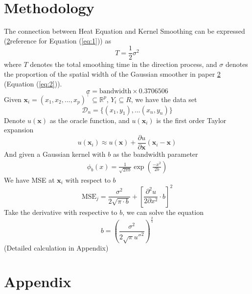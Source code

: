 \documentclass{article}
\begin{document}
\section{Methodology}
The connection between Heat Equation and Kernel Smoothing can be expressed (\ref{}reference for Equation (\ref{eq:1})) as
\begin{equation}
    T = \frac{1}{2} \sigma^2         \label{eq:1}
\end{equation} 
where $T$ denotes the total smoothing time in the direction process, and $\sigma$ denotes the proportion of the spatial width of the Gaussian smoother in paper \ref{} (Equation (\ref{eq:2})).
\begin{equation}
    \sigma = \text{bandwidth}\times 0.3706506  \label{eq:2}
\end{equation}
Given $\mathbf{x}_i =(x_1, x_2,...,x_p)^\top \subseteq \mathbb{R}^p $, $Y_i\subseteq R$, we have the data set $$\mathcal{D}_n = \big\{(x_1, y_1),... (x_n, y_n)\big\}$$
Denote $u(\mathbf{x})$ as the oracle function, and $u(\mathbf{x}_i)$ is the first order Taylor expansion
\begin{equation}
      u(\mathbf{x}_i) \approx u(\mathbf{x}) + \frac{\partial u}{\partial \mathbf{x}}(\mathbf{x}_i - \mathbf{x}) 
\end{equation}
And given a Gaussian kernel with $b$ as the bandwidth parameter
\begin{align}
    \phi_b (x) = \frac{1}{\sqrt{2 \pi b}}\exp(\frac{-x^2}{2b})
\end{align}
We have MSE at $\mathbf{x}_i$ with respect to $b$
\begin{equation}
         \text{MSE}_j=  \frac{\sigma^2}{2\sqrt{\pi \cdot b}}  + \left[\frac{\partial^2 u}{2\partial x^2}\cdot b \right]^2
\end{equation}
Take the derivative with respective to $b$, we can solve the equation 
\begin{equation}
    b =\left(\frac{\sigma^2}{2\sqrt{\pi} u''^2}\right)^{\frac{2}{5}} 
\end{equation}
(Detailed calculation in Appendix) 












\pagebreak

\section{Appendix}
\end{document}

